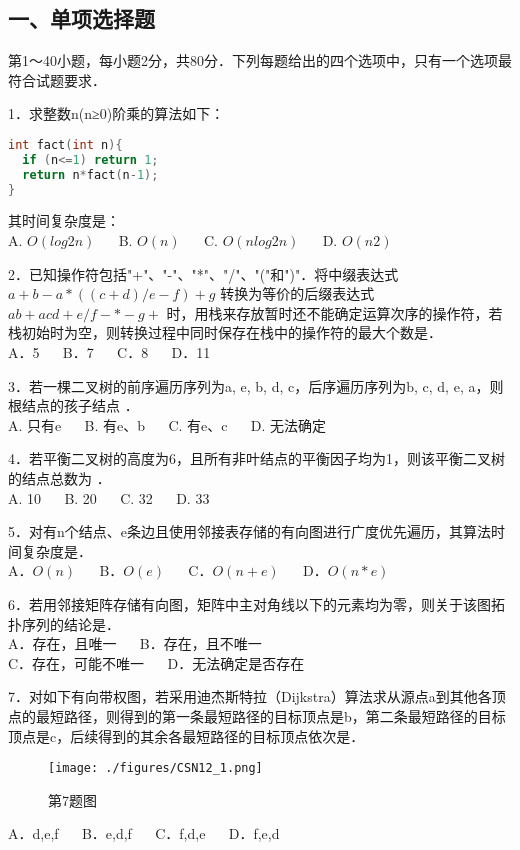 
\subsection{一、单项选择题}
第1～40小题，每小题2分，共80分．下列每题给出的四个选项中，只有一个选项最符合试题要求．

1．求整数n(n≥0)阶乘的算法如下： \\
\begin{lstlisting}[language=cpp]
int fact(int n){
  if (n<=1) return 1;
  return n*fact(n-1);
}
\end{lstlisting}
其时间复杂度是：\\
A. $O(log2n)$ $\quad$ B. $O(n)$ $\quad$ C. $O(nlog2n)$ $\quad$ D. $O(n2)$

2．已知操作符包括"+"、"-"、"*"、"/"、"("和")"．将中缀表达式 $a+b-a*((c+d)/e-f)+g$ 转换为等价的后缀表达式 $ab+acd+e/f-*-g+$ 时，用栈来存放暂时还不能确定运算次序的操作符，若栈初始时为空，则转换过程中同时保存在栈中的操作符的最大个数是． \\
A．5 $\quad$ B．7 $\quad$ C．8 $\quad$ D．11

3．若一棵二叉树的前序遍历序列为a, e, b, d, c，后序遍历序列为b, c, d, e, a，则根结点的孩子结点 ． \\
A. 只有e $\quad$ B. 有e、b $\quad$ C. 有e、c $\quad$ D. 无法确定

4．若平衡二叉树的高度为6，且所有非叶结点的平衡因子均为1，则该平衡二叉树的结点总数为 ． \\
A. 10 $\quad$ B. 20 $\quad$ C. 32 $\quad$ D. 33

5．对有n个结点、e条边且使用邻接表存储的有向图进行广度优先遍历，其算法时间复杂度是．\\
A．$O(n)$ $\quad$ B．$O(e)$ $\quad$ C．$O(n+e)$ $\quad$ D．$O(n*e)$

6．若用邻接矩阵存储有向图，矩阵中主对角线以下的元素均为零，则关于该图拓扑序列的结论是．\\
A．存在，且唯一 $\quad$ B．存在，且不唯一\\
C．存在，可能不唯一 $\quad$ D．无法确定是否存在

7．对如下有向带权图，若采用迪杰斯特拉（Dijkstra）算法求从源点a到其他各顶点的最短路径，则得到的第一条最短路径的目标顶点是b，第二条最短路径的目标顶点是c，后续得到的其余各最短路径的目标顶点依次是．\\
\begin{figure}[ht]
\centering
\texttt{[image: ./figures/CSN12\_1.png]}
\caption{第7题图} \label{CSN12_fig1}
\end{figure}
A．d,e,f $\quad$ B．e,d,f $\quad$ C．f,d,e $\quad$ D．f,e,d

